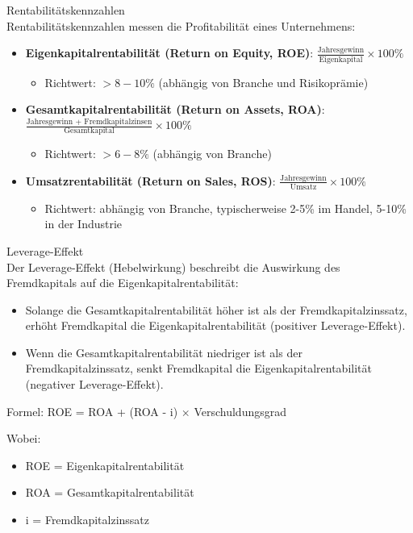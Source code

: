 \begin{definition}{Rentabilitätskennzahlen}\\
Rentabilitätskennzahlen messen die Profitabilität eines Unternehmens:
\begin{itemize}
    \item \textbf{Eigenkapitalrentabilität (Return on Equity, ROE)}: $\frac{\text{Jahresgewinn}}{\text{Eigenkapital}} \times 100\%$
    \begin{itemize}
        \item Richtwert: $> 8-10\%$ (abhängig von Branche und Risikoprämie)
    \end{itemize}
    \item \textbf{Gesamtkapitalrentabilität (Return on Assets, ROA)}: $\frac{\text{Jahresgewinn + Fremdkapitalzinsen}}{\text{Gesamtkapital}} \times 100\%$
    \begin{itemize}
        \item Richtwert: $> 6-8\%$ (abhängig von Branche)
    \end{itemize}
    \item \textbf{Umsatzrentabilität (Return on Sales, ROS)}: $\frac{\text{Jahresgewinn}}{\text{Umsatz}} \times 100\%$
    \begin{itemize}
        \item Richtwert: abhängig von Branche, typischerweise 2-5\% im Handel, 5-10\% in der Industrie
    \end{itemize}
\end{itemize}
\end{definition}

\begin{concept}{Leverage-Effekt}\\
Der Leverage-Effekt (Hebelwirkung) beschreibt die Auswirkung des Fremdkapitals auf die Eigenkapitalrentabilität:
\begin{itemize}
    \item Solange die Gesamtkapitalrentabilität höher ist als der Fremdkapitalzinssatz, erhöht Fremdkapital die Eigenkapitalrentabilität (positiver Leverage-Effekt).
    \item Wenn die Gesamtkapitalrentabilität niedriger ist als der Fremdkapitalzinssatz, senkt Fremdkapital die Eigenkapitalrentabilität (negativer Leverage-Effekt).
\end{itemize}

Formel: ROE = ROA + (ROA - i) $\times$ Verschuldungsgrad

Wobei:
\begin{itemize}
    \item ROE = Eigenkapitalrentabilität
    \item ROA = Gesamtkapitalrentabilität
    \item i = Fremdkapitalzinssatz
\end{itemize}
\end{concept}

